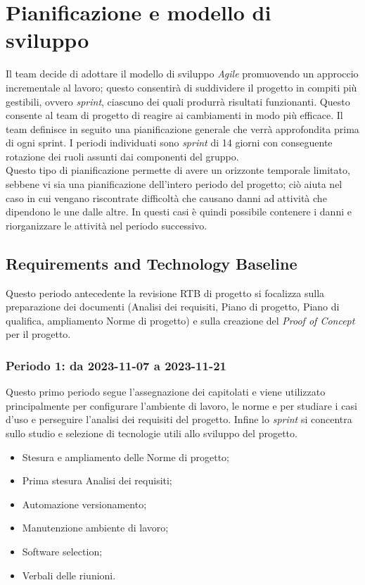 \documentclass[10pt, a4paper]{article}
\begin{document}
{{{{{{{{%
\section{Pianificazione e modello di sviluppo}
\label{section:Pianificazione}

Il team decide di adottare il modello di sviluppo \textit{Agile} 
promuovendo un approccio incrementale al lavoro; questo consentirà di suddividere il progetto in compiti più gestibili, ovvero \textit{sprint}, ciascuno dei quali produrrà risultati funzionanti. Questo consente al team di progetto di reagire ai cambiamenti in modo più efficace.
Il team definisce in seguito una pianificazione generale che verrà approfondita prima di ogni sprint.
I periodi individuati sono \textit{sprint} di 14 giorni con conseguente rotazione dei ruoli assunti dai componenti del gruppo.\\
Questo tipo di pianificazione permette di avere un orizzonte temporale limitato, sebbene vi sia una pianificazione dell'intero periodo del progetto; ciò aiuta nel caso in cui vengano riscontrate difficoltà che causano danni ad attività che dipendono le une dalle altre. In questi casi è quindi possibile contenere i danni e riorganizzare le attività nel periodo successivo.

\subsection{Requirements and Technology Baseline}
Questo periodo antecedente la revisione RTB di progetto si focalizza sulla preparazione dei documenti (Analisi dei requisiti, Piano di progetto, Piano di qualifica, ampliamento Norme di progetto) e sulla creazione del \textit{Proof of Concept} per il progetto.
\subsubsection{Periodo 1: da 2023-11-07 a 2023-11-21}
Questo primo periodo segue l'assegnazione dei capitolati e viene utilizzato principalmente per configurare l'ambiente di lavoro, le norme e per studiare i casi d'uso e perseguire l'analisi dei requisiti del progetto. Infine lo \textit{sprint} si concentra sullo studio e selezione di tecnologie utili allo sviluppo del progetto.
\begin{itemize}
    \item Stesura e ampliamento delle Norme di progetto;
    \item Prima stesura Analisi dei requisiti;
    \item Automazione versionamento;
    \item Manutenzione ambiente di lavoro;
    \item Software selection;
    \item Verbali delle riunioni.
        

\end{itemize}}}}}}}}}
\end{document}
